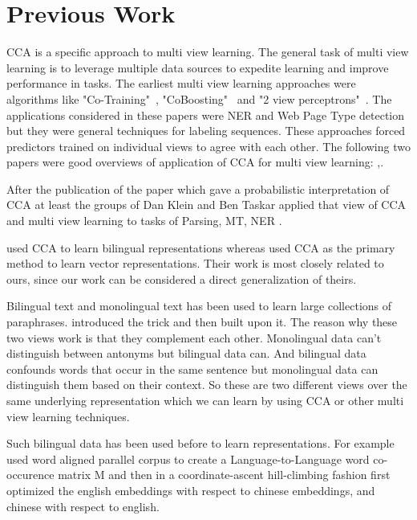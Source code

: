 \documentclass[11pt]{article}
\begin{document}
\section{Previous Work}
CCA is a specific approach to multi view learning. The general task of
multi view learning is to leverage multiple data sources to expedite
learning and improve performance in tasks. The earliest multi view
learning approaches were algorithms like
"Co-Training"~\cite{blum1998combining},
"CoBoosting"~\cite{collins1999unsupervised} and "2 view
perceptrons"~\cite{brefeld2006efficient}. The applications considered
in these papers were NER and Web Page Type detection but they were
general techniques for labeling sequences. These approaches forced
predictors trained on individual views to agree with each other.  
The following two papers were good overviews of application of CCA for
multi view learning: \cite{kakade2007multi},\cite{ganchevuai08}.

After the publication of the paper \cite{bach2005probabilistic} which gave a probabilistic
interpretation of CCA at least the groups of Dan Klein and Ben Taskar
applied that view of CCA and multi view learning to tasks of Parsing,
MT, NER \cite{ganchevuai08,Burkett2008Two,burkett2010learning,haghighi2008learning}.

\cite{faruqui2014improving} used CCA to learn bilingual
representations whereas \cite{dhillon2011multi,dhillon2012two} used
CCA as the primary method to learn vector representations. Their work
is most closely related to ours, since our 
work can be considered a direct generalization of theirs. 

Bilingual text and monolingual text has been used to learn large
collections of paraphrases. \cite{bannard2005paraphrasing} introduced
the trick and 
then \cite{ganitkevitch2013ppdb} built upon it. The reason why these
two views work is 
that they complement each other. Monolingual data can't distinguish
between antonyms but bilingual data can. And bilingual data confounds
words that occur in the same sentence but monolingual data can
distinguish them based on their context. So these are two different
views over the same underlying representation which we can learn by
using CCA or other multi view learning techniques.

Such bilingual data has been used before to learn
representations. For example \cite{zou2013bilingual} used word aligned
parallel corpus to create a Language-to-Language word co-occurence
matrix M and then in a coordinate-ascent hill-climbing fashion first
optimized the english embeddings with respect to chinese embeddings,
and chinese with respect to english.
\end{document}
